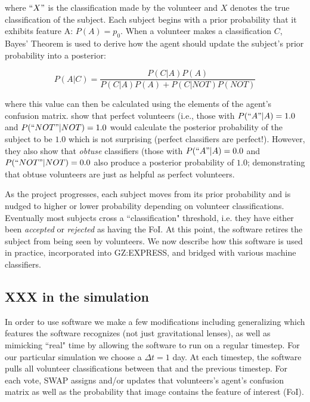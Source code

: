 \documentclass[twocolumn]{aastex6}
\begin{document}
where $``X"$ is the classification made by the volunteer and $X$ denotes the true 
classification of the subject. Each subject begins with a prior probability that 
it exhibits feature A: $P(A) = p_0$. When a volunteer makes a classification $C$, 
Bayes' Theorem is used to derive how the agent should update the subject's prior 
probability into a posterior: 

\begin{equation}
P(A|C) = \frac{ P(C|A) P(A) }{P(C|A) P(A) + P(C|NOT) P(NOT)}
\end{equation}

where this value can then be calculated using the elements of the agent's 
confusion matrix. \cite{Marshall2016} show that perfect volunteers (i.e., those 
with $P(``A"| A) = 1.0$ and $P(``NOT" | NOT) = 1.0$ would calculate the posterior
probability of the subject to be $1.0$ which is not surprising (perfect classifiers 
are perfect!). However, they also show that \textit{obtuse} classifiers (those with 
$P(``A" | A) = 0.0$ and $P(``NOT" | NOT) = 0.0$ also produce a posterior probability 
of $1.0$; demonstrating that obtuse volunteers are just as helpful as perfect volunteers.

As the project progresses, each subject moves from its prior probability and is 
nudged to higher or lower probability depending on volunteer classifications. 
Eventually most subjects cross a ``classification" threshold, i.e. they have either
been \textit{accepted} or \textit{rejected} as having the FoI. At this point, the 
software retires the subject from being seen by volunteers. We now describe how 
this software is used in practice, incorporated into GZ:EXPRESS, and bridged with 
various machine classifiers. 


\subsection{XXX in the simulation}
In order to use \cite{Marshall2016} software we make a few modifications including 
generalizing which features the software recognizes (not just gravitational lenses), as well as
mimicking ``real" time by allowing the software to run on a regular timestep. 
For our particular simulation we choose a $\Delta t = 1$ day. At each timestep, 
the software pulls all volunteer classifications between that and the previous timestep. 
For each vote, SWAP assigns and/or updates that volunteers's agent's confusion 
matrix as well as the probability that image contains the feature of interest (FoI). 
\end{document}

